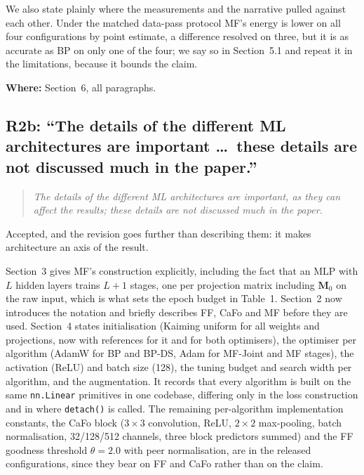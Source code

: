\documentclass[11pt,a4paper]{article}
\newcommand{\FF}{FF}
\newcommand{\MF}{MF}
\newcommand{\BP}{BP}
\newcommand{\CaFo}{CaFo}
\newcommand{\BPDS}{BP-DS}
\newcommand{\MFJ}{MF-Joint}
\newenvironment{comment}%
  {\begin{quote}\itshape\small}%
  {\end{quote}}
\newcommand{\where}[1]{\par\smallskip\noindent\textbf{Where:} #1\par}
\begin{document}
We also state plainly where the measurements and the narrative pulled against
each other. Under the matched data-pass protocol \MF{}'s energy is lower on all four
configurations by point estimate, a difference resolved on three, but it is as
accurate as \BP{} on only one of the four; we say so in Section~5.1 and
repeat it in the limitations, because it bounds the claim.

\where{Section~6, all paragraphs.}

\subsection*{R2b: ``The details of the different ML architectures are
important \dots\ these details are not discussed much in the paper.''}

\begin{comment}
The details of the different ML architectures are important, as they can
affect the results; these details are not discussed much in the paper.
\end{comment}

\noindent
Accepted, and the revision goes further than describing them: it makes
architecture an axis of the result.

Section~3 gives \MF{}'s construction explicitly, including the fact that an
MLP with $L$ hidden layers trains $L+1$ stages, one per projection matrix
including $\mathbf{M}_0$ on the raw input, which is what sets the epoch budget in
Table~1. Section~2 now introduces the notation and briefly describes \FF{}, \CaFo{}
and \MF{} before they are used. Section~4 states initialisation (Kaiming
uniform for all weights and projections, now with references for it and for
both optimisers), the optimiser per algorithm (AdamW for \BP{} and \BPDS{}, Adam
for \MFJ{} and \MF{} stages), the activation (ReLU) and batch size (\num{128}), the tuning budget and search width per algorithm, and the augmentation. It records that
every algorithm is built on the same \texttt{nn.Linear} primitives in one
codebase, differing only in the loss construction and in where
\texttt{detach()} is called. The remaining per-algorithm implementation
constants, the \CaFo{} block ($3{\times}3$ convolution, ReLU, $2{\times}2$
max-pooling, batch normalisation, \num{32}/\num{128}/\num{512} channels, three
block predictors summed) and the \FF{} goodness threshold $\theta=\num{2.0}$
with peer normalisation, are in the released configurations, since they bear
on \FF{} and \CaFo{} rather than on the claim.
\end{document}
